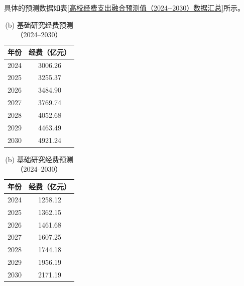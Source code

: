 具体的预测数据如表\ref{高校经费支出融合预测值（2024--2030）数据汇总}所示。

\begin{table}[H]
  \centering
  \caption{高校经费支出融合预测值（2024--2030）数据汇总表}
  \begin{minipage}[t]{0.48\textwidth}
    \centering
    \caption*{(a) 总经费支出预测（2024--2030）}
    \vspace{0.5em}
    \begin{tabular}{lc}
      \toprule
      年份 & 经费（亿元） \\
      \midrule
      2024 & 3006.26 \\
      2025 & 3255.37 \\
      2026 & 3484.90 \\
      2027 & 3769.74 \\
      2028 & 4052.68 \\
      2029 & 4463.49 \\
      2030 & 4921.24 \\
      \bottomrule
    \end{tabular}
  \end{minipage}
  \hfill
  \begin{minipage}[t]{0.48\textwidth}
    \centering
    \caption*{(b) 基础研究经费预测（2024--2030）}
    \vspace{0.5em}
    \begin{tabular}{lc}
      \toprule
      年份 & 经费（亿元） \\
      \midrule
      2024 & 1258.12 \\
      2025 & 1362.15 \\
      2026 & 1461.68 \\
      2027 & 1607.25 \\
      2028 & 1744.18 \\
      2029 & 1956.19 \\
      2030 & 2171.19 \\
      \bottomrule
    \end{tabular}
  \end{minipage}
  
  \vspace{1em}
  

\end{table}
